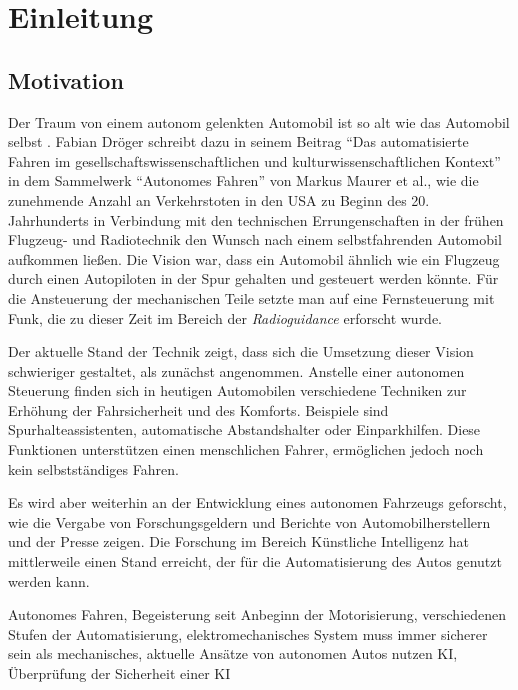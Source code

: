 \chapter{Einleitung}
\label{cha:Einleitung}
\setlength{\epigraphwidth}{4in}

\section{Motivation}
Der Traum von einem autonom gelenkten Automobil ist so alt wie das Automobil selbst \cite{maurer_autonomes_2015}. Fabian Dröger schreibt dazu in seinem Beitrag "`Das automatisierte Fahren im gesellschaftswissenschaftlichen und kulturwissenschaftlichen Kontext"' in dem Sammelwerk "`Autonomes Fahren"' von Markus Maurer et al., wie die zunehmende Anzahl an Verkehrstoten in den USA zu Beginn des 20. Jahrhunderts in Verbindung mit den technischen Errungenschaften in der frühen Flugzeug- und Radiotechnik den Wunsch nach einem selbstfahrenden Automobil aufkommen ließen. Die Vision war, dass ein Automobil ähnlich wie ein Flugzeug durch einen Autopiloten in der Spur gehalten und gesteuert werden könnte. Für die Ansteuerung der mechanischen Teile setzte man auf eine Fernsteuerung mit Funk, die zu dieser Zeit im Bereich der \emph{Radioguidance} erforscht wurde.

Der aktuelle Stand der Technik zeigt, dass sich die Umsetzung dieser Vision schwieriger gestaltet, als zunächst angenommen. Anstelle einer autonomen Steuerung finden sich in heutigen Automobilen verschiedene Techniken zur Erhöhung der Fahrsicherheit und des Komforts. Beispiele sind Spurhalteassistenten, automatische Abstandshalter oder Einparkhilfen. Diese Funktionen unterstützen einen menschlichen Fahrer, ermöglichen jedoch noch kein selbstständiges Fahren.

Es wird aber weiterhin an der Entwicklung eines autonomen Fahrzeugs geforscht, wie die Vergabe von Forschungsgeldern\cite{bmbf-internetredaktion_auto_nodate} und Berichte von Automobilherstellern\cite{bmw_autonomes_nodate} und der Presse\cite{efler_autonomes_2018} zeigen. Die Forschung im Bereich Künstliche Intelligenz hat mittlerweile einen Stand erreicht, der für die Automatisierung des Autos genutzt werden kann.   

 


Autonomes Fahren, Begeisterung seit Anbeginn der Motorisierung, verschiedenen Stufen der Automatisierung, elektromechanisches System muss immer sicherer sein als mechanisches, aktuelle Ansätze von autonomen Autos nutzen KI, Überprüfung der Sicherheit einer KI 

